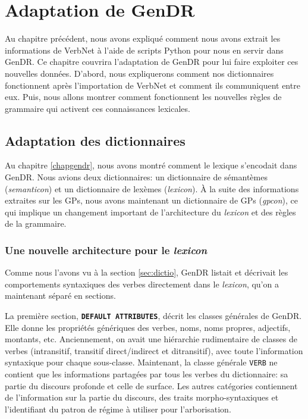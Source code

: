 
\chapter{Adaptation de GenDR}\label{ch:implementation}

Au chapitre précédent, nous avons expliqué comment nous avons extrait les informations de VerbNet à l'aide de scripts Python pour nous en servir dans GenDR. Ce chapitre couvrira l'adaptation de GenDR pour lui faire exploiter ces nouvelles données. D'abord, nous expliquerons comment nos dictionnaires fonctionnent après l'importation de VerbNet et comment ils communiquent entre eux. Puis, nous allons montrer comment fonctionnent les nouvelles règles de grammaire qui activent ces connaissances lexicales.

\section{Adaptation des dictionnaires}

Au chapitre \ref{chapgendr}, nous avons montré comment le lexique s'encodait dans GenDR. Nous avions deux dictionnaires: un dictionnaire de sémantèmes (\emph{semanticon}) et un dictionnaire de lexèmes (\emph{lexicon}). À la suite des informations extraites sur les \acp{GP}, nous avons maintenant un dictionnaire de \acp{GP} (\emph{gpcon}), ce qui implique un changement important de l'architecture du \emph{lexicon} et des règles de la grammaire.

\subsection{Une nouvelle architecture pour le \emph{lexicon}}

Comme nous l'avons vu à la section \ref{sec:dictio}, GenDR listait et décrivait les comportements syntaxiques des verbes directement dans le \emph{lexicon}, qu'on a maintenant séparé en  sections.

La première section, \textbf{\texttt{DEFAULT ATTRIBUTES}}, décrit les classes générales de GenDR. Elle donne les propriétés génériques des verbes, noms, noms propres, adjectifs, montants, etc. Anciennement, on avait une hiérarchie rudimentaire de classes de verbes (intransitif, transitif direct/indirect et ditransitif), avec toute l'information syntaxique pour chaque sous-classe. Maintenant, la classe générale \texttt{VERB} ne contient que les informations partagées par tous les verbes du dictionnaire: sa partie du discours profonde et celle de surface. Les autres catégories contiennent de l'information sur la partie du discours, des traits morpho-syntaxiques et l'identifiant du patron de régime à utiliser pour l'arborisation. 

